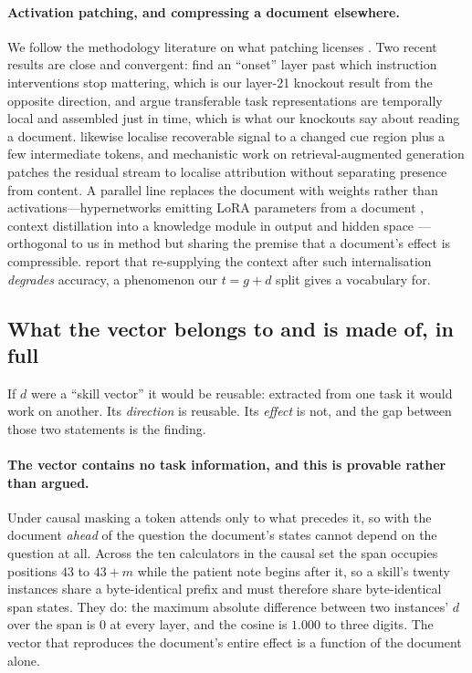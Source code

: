\documentclass{article}
\newcommand{\dvec}{\ensuremath{d}}
\newcommand{\gvec}{\ensuremath{g}}
\newcommand{\tvec}{\ensuremath{t}}
\begin{document}
\paragraph{Activation patching, and compressing a document elsewhere.}
We follow the methodology literature on what patching licenses
\citep{zhang2023bestpractices, heimersheim2024patching}. Two recent results are
close and convergent: \citet{onset2025instruction} find an ``onset'' layer past
which instruction interventions stop mattering, which is our layer-21 knockout
result from the opposite direction, and \citet{jit2025taskrepr} argue
transferable task representations are temporally local and assembled just in
time, which is what our knockouts say about reading a document.
\citet{semanticconflicts2026} likewise localise recoverable signal to a changed
cue region plus a few intermediate tokens, and mechanistic work on
retrieval-augmented generation \citep{ragcite2026} patches the residual stream
to localise attribution without separating presence from content. A parallel
line replaces the document with weights rather than activations---hypernetworks
emitting LoRA parameters from a document \citep{doc2lora2026}, context
distillation into a knowledge module in output and hidden space
\citep{deepcontextdistill2025}---orthogonal to us in method but sharing the
premise that a document's effect is compressible.
\citet{contextreturns2026} report that re-supplying the context after such
internalisation \emph{degrades} accuracy, a phenomenon our $\tvec=\gvec+\dvec$
split gives a vocabulary for.




\subsection{What the vector belongs to and is made of, in full}
\label{app:belongs}

If $\dvec$ were a ``skill vector'' it would be reusable: extracted from one task
it would work on another. Its \emph{direction} is reusable. Its \emph{effect} is
not, and the gap between those two statements is the finding.

\paragraph{The vector contains no task information, and this is provable rather
than argued.} Under causal masking a token attends only to what precedes it, so
with the document \emph{ahead} of the question the document's states cannot
depend on the question at all. Across the ten calculators in the causal set the
span occupies positions $43$ to $43+m$ while the patient note begins after it,
so a skill's twenty instances share a byte-identical prefix and must therefore
share byte-identical span states. They do: the maximum absolute difference
between two instances' $\dvec$ over the span is $0$ at every layer, and the
cosine is $1.000$ to three digits. The vector that reproduces the document's
entire effect is a function of the document alone.
\end{document}
